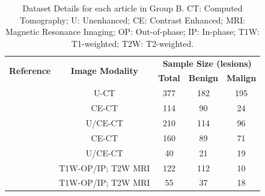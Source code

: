 \documentclass[11pt]{article}
\begin{document}
\begin{table}[]
    \centering
    \begin{tabular}{ccccc}\toprule
        \multirow{2}{*}{\textbf{Reference}} & \multirow{2}{*}{\textbf{Image Modality}} & \multicolumn{3}{c}{\textbf{Sample Size (lesions)}}
        \\\cmidrule(lr){3-5}
                                            &                                          & \textbf{Total}                                     & \textbf{Benign} & \textbf{Malign} \\\midrule
        \cite{Shoemaker2018}                & U-CT                                     & 377                                                & 182             & 195             \\
        \cite{Koyuncu2019}                  & CE-CT                                    & 114                                                & 90              & 24              \\
        \cite{Li2019}                       & U/CE-CT                                  & 210                                                & 114             & 96              \\
        \cite{Andersen2021}                 & CE-CT                                    & 160                                                & 89              & 71              \\
        \cite{Moawad2021}                   & U/CE-CT                                  & 40                                                 & 21              & 19              \\
        \cite{Barstugan2020}                & T1W-OP/IP; T2W MRI                       & 122                                                & 112             & 10              \\
        \cite{Stanzione2021}                & T1W-OP/IP; T2W MRI                       & 55                                                 & 37              & 18              \\
        \bottomrule
    \end{tabular}
    \caption{Dataset Details for each article in Group B. CT: Computed Tomography; U: Unenhanced; CE: Contrast Enhanced; MRI: Magnetic Resonance Imaging; OP: Out-of-phase; IP: In-phase; T1W: T1-weighted; T2W: T2-weighted.}
    \label{tab:data_B}
\end{table}
\end{document}
